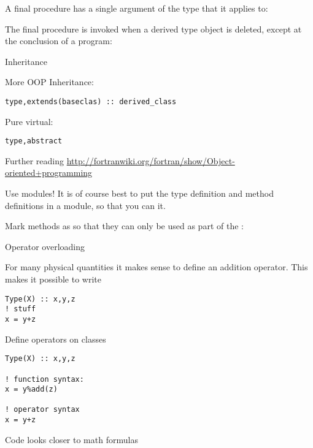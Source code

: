 
A final procedure has a single argument of the type that it applies to:


The final procedure is invoked when a derived type object is deleted,
except at the conclusion of a program:


 {Inheritance}

\begin{block}{More OOP}
  \label{sl:oopf}
Inheritance:
\begin{lstlisting}
type,extends(baseclas) :: derived_class
\end{lstlisting}
Pure virtual:
\begin{lstlisting}
type,abstract
\end{lstlisting}
\end{block}

\begin{block}{Further reading}
  \url{http://fortranwiki.org/fortran/show/Object-oriented+programming}
\end{block}

\begin{block}{Use modules!}
  \label{sl:fclass-module}
   It is of course best to put the type definition and method
   definitions in a module, so that you can  it.

   Mark methods as  so that they can only be used as part
   of the :

\end{block}

 {Operator overloading}

For many physical quantities it makes sense to define an addition operator.
This makes it possible to write
\begin{lstlisting}
Type(X) :: x,y,z
! stuff
x = y+z
\end{lstlisting}

\begin{slide}{Define operators on classes}
  \label{sl:foverload0}
\begin{lstlisting}
Type(X) :: x,y,z

! function syntax:
x = y%add(z)

! operator syntax
x = y+z
\end{lstlisting}
Code looks closer to math formulas
\end{slide}

